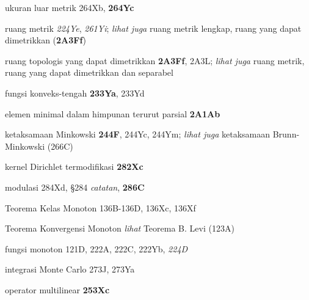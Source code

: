 ukuran luar metrik 264Xb, {\bf 264Yc}


ruang metrik {\it 224Ye}, {\it 261Yi}; 
  {\it lihat juga} ruang metrik lengkap, ruang yang dapat dimetrikkan ({\bf 2A3Ff})








ruang topologis yang dapat dimetrikkan {\bf 2A3Ff}, 2A3L; 
  {\it lihat juga} ruang metrik,
ruang yang dapat dimetrikkan dan separabel













fungsi konveks-tengah {\bf 233Ya}, 233Yd


elemen minimal dalam himpunan terurut parsial {\bf 2A1Ab}


ketaksamaan Minkowski {\bf 244F}, 244Yc, 244Ym;
  {\it lihat juga} ketaksamaan Brunn-Minkowski (266C)


















kernel Dirichlet termodifikasi {\bf 282Xc}






modulasi 284Xd, \S284 {\it catatan}, {\bf 286C}




Teorema Kelas Monoton 136B-136D, 
136Xc, 136Xf

Teorema Konvergensi Monoton {\it lihat} Teorema B. Levi (123A)



fungsi monoton 121D, 222A, 222C, 222Yb, {\it 224D}



integrasi Monte Carlo 273J, 273Ya




operator multilinear {\bf 253Xc}

















